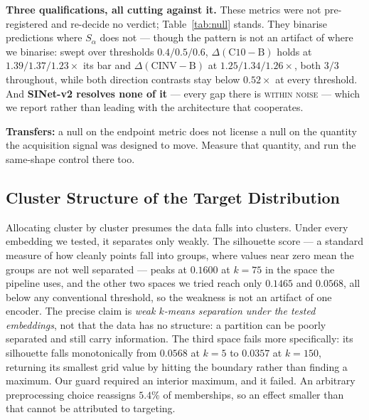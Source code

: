 \documentclass{article} %
\begin{document}
\textbf{Three qualifications, all cutting against it.} These metrics were not pre-registered and
re-decide no verdict; Table~\ref{tab:null} stands. They binarise predictions where $S_\alpha$ does
not --- though the pattern is not an artifact of where we binarise: swept over thresholds
$0.4/0.5/0.6$, $\Delta(\mathrm{C10}-\mathrm{B})$ holds at $1.39/1.37/1.23\times$ its bar and
$\Delta(\mathrm{CINV}-\mathrm{B})$ at $1.25/1.34/1.26\times$, both $3/3$ throughout, while both
direction contrasts stay below $0.52\times$ at every threshold. And \textbf{SINet-v2 resolves none of
it} --- every gap there is \textsc{within noise} --- which we report rather than leading with the
architecture that cooperates.

\textbf{Transfers:} a null on the endpoint metric does not license a null on the quantity the
acquisition signal was designed to move. Measure that quantity, and run the same-shape control
there too.

\subsection{Cluster Structure of the Target Distribution}
\label{sec:res-structure}

Allocating cluster by cluster presumes the data falls into clusters. Under every embedding we
tested, it separates only weakly. The silhouette score --- a standard measure of how cleanly points
fall into groups, where values near zero mean the groups are not well separated --- peaks at
$0.1600$ at $k = 75$ in the space the pipeline uses, and the other two spaces we tried reach only
$0.1465$ and $0.0568$, all below any conventional threshold, so the weakness is not an artifact of
one encoder. The precise claim is \emph{weak $k$-means separation under the tested embeddings},
not that the data has no structure: a partition can be poorly separated and still carry information.
The third space fails more specifically: its silhouette falls monotonically from $0.0568$ at $k=5$
to $0.0357$ at $k=150$, returning its smallest grid value by hitting the boundary rather than
finding a maximum. Our guard required an interior maximum, and it failed. An arbitrary preprocessing
choice reassigns $5.4\%$ of memberships, so an effect smaller than that cannot be attributed to
targeting.
\end{document}
